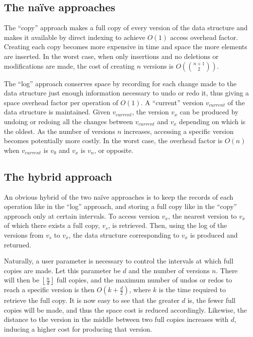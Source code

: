 \subsection{The na\"ive approaches}
The ``copy'' approach makes a full copy of every version of the data structure
and makes it available by direct indexing to achieve $O(1)$ access overhead
factor. Creating each copy becomes more expensive in time and space the more
elements are inserted. In the worst case, when only insertions and no deletions
or modifications are made, the cost of creating $n$ versions is
$O\left(\binom{n+1}{2}\right)$.

The ``log'' approach conserves space by recording for each change made to the
data structure just enough information necessary to undo or redo it, thus giving
a space overhead factor per operation of $O(1)$. A ``current'' version
$v_{current}$ of the data structure is maintained. Given $v_{current}$, the
version $v_x$ can be produced by undoing or redoing all the changes between
$v_{current}$ and $v_x$ depending on which is the oldest. As the number of
versions $n$ increases, accessing a specific version becomes potentially more
costly. In the worst case, the overhead factor is $O(n)$ when $v_{current}$ is
$v_0$ and $v_x$ is $v_n$, or opposite.

\subsection{The hybrid approach}
An obvious hybrid of the two na\"ive approaches is to keep the records of each
operation like in the ``log'' approach, and storing a full copy like in the
``copy'' approach only at certain intervals. To access version $v_x$, the
nearest version to $v_x$ of which there exists a full copy, $v_s$, is retrieved.
Then, using the log of the versions from $v_s$ to $v_x$, the data structure
corresponding to $v_x$ is produced and returned.

Naturally, a user parameter is necessary to control the intervals at which full
copies are made. Let this parameter be $d$ and the number of versions $n$. There
will then be $\left\lfloor \frac{n}{d} \right\rfloor$ full copies, and the
maximum number of undos or redos to reach a specific version is then
$O(k+\frac{d}{2})$, where $k$ is the time required to retrieve the full copy. It
is now easy to see that the greater $d$ is, the fewer full copies will be made,
and thus the space cost is reduced accordingly. Likewise, the distance to the
version in the middle between two full copies increases with $d$, inducing a
higher cost for producing that version.


